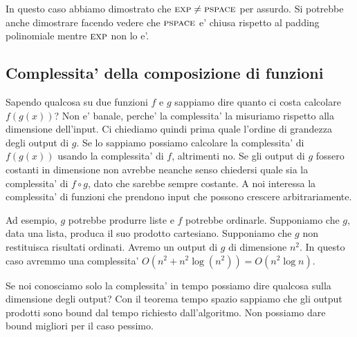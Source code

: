In questo caso abbiamo dimostrato che $\textsc{exp} \not= \textsc{pspace}$ per assurdo. Si potrebbe anche dimostrare
facendo vedere che $\textsc{pspace}$ e' chiusa rispetto al padding polinomiale mentre $\textsc{exp}$ non lo e'.

\subsection{Complessita' della composizione di funzioni}

Sapendo qualcosa su due funzioni $f$ e $g$ sappiamo dire quanto ci costa calcolare $f(g(x))$? Non e'
banale, perche' la complessita' la misuriamo rispetto alla dimensione dell'input. Ci chiediamo
quindi prima quale l'ordine di grandezza degli output di $g$. Se lo sappiamo possiamo calcolare la
complessita' di $f(g(x))$ usando la complessita' di $f$, altrimenti no. Se gli output di $g$ fossero
costanti in dimensione non avrebbe neanche senso chiedersi quale sia la complessita' di $f \circ g$,
dato che sarebbe sempre costante. A noi interessa la complessita' di funzioni che prendono input che
possono crescere arbitrariamente.

Ad esempio, $g$ potrebbe produrre liste e $f$ potrebbe ordinarle. Supponiamo che $g$, data una
lista, produca il suo prodotto cartesiano. Supponiamo che $g$ non restituisca risultati ordinati.
Avremo un output di $g$ di dimensione $n^{2}$. In questo caso avremmo una complessita' $O(n^{2} +
n^{2}\log(n^{2})) = O(n^{2}\log{n})$.

Se noi conosciamo solo la complessita' in tempo possiamo dire qualcosa sulla dimensione degli
output? Con il teorema tempo spazio sappiamo che gli output prodotti sono bound dal tempo richiesto
dall'algoritmo. Non possiamo dare bound migliori per il caso pessimo.

